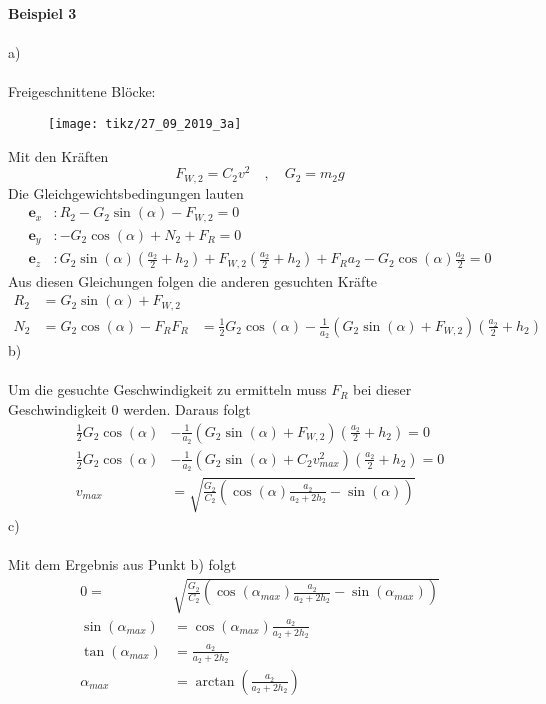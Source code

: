 \textbf{Beispiel 3}\\ \\
a)\\ \\
Freigeschnittene Blöcke:
\begin{figure}[h]
	\centering
	\texttt{[image: tikz/27\_09\_2019\_3a]}
\end{figure}
\newline
Mit den Kräften
\[
	F_{W,2} = C_2v^2 \quad,\quad G_2 = m_2g
\]
Die Gleichgewichtsbedingungen lauten
\begin{align*}
	\textbf{e}_x &: R_2 - G_2\sin(\alpha) - F_{W,2} = 0\\
	\textbf{e}_y &: -G_2\cos(\alpha) + N_2  + F_R= 0 \\
	\textbf{e}_z &: G_2\sin(\alpha)\left(\frac{a_2}{2} + h_2\right) + F_{W,2}\left(\frac{a_2}{2} + h_2\right) + F_Ra_2 - G_2\cos(\alpha)\frac{a_2}{2} = 0
\end{align*}
Aus diesen Gleichungen folgen die anderen gesuchten Kräfte
\begin{align*}
	R_2 &= G_2\sin(\alpha) + F_{W,2} \\
	N_2 &= G_2\cos(\alpha) - F_R
	F_R &= \frac{1}{2}G_2\cos(\alpha) - \frac{1}{a_2}\left(G_2\sin(\alpha) + F_{W,2}\right)\left(\frac{a_2}{2} + h_2\right)
\end{align*}
b)\\ \\
Um die gesuchte Geschwindigkeit zu ermitteln muss $F_R$ bei dieser Geschwindigkeit 0 werden. Daraus folgt
\begin{align*}
	\frac{1}{2}G_2\cos(\alpha) &- \frac{1}{a_2}\left(G_2\sin(\alpha) + F_{W,2}\right)\left(\frac{a_2}{2} + h_2\right) = 0 \\
	\frac{1}{2}G_2\cos(\alpha) &- \frac{1}{a_2}\left(G_2\sin(\alpha) + C_2v^2_{max}\right)\left(\frac{a_2}{2} + h_2\right) = 0 \\
	v_{max} &= \sqrt{\frac{G_2}{C_2}\left(\cos(\alpha)\frac{a_2}{a_2 + 2h_2} - \sin(\alpha)\right)}
\end{align*}
c)\\ \\
Mit dem Ergebnis aus Punkt b) folgt
\begin{align*}
	0 = &\sqrt{\frac{G_2}{C_2}\left(\cos(\alpha_{max})\frac{a_2}{a_2 + 2h_2} - \sin(\alpha_{max})\right)}\\
	\sin(\alpha_{max}) &= \cos(\alpha_{max})\frac{a_2}{a_2 + 2h_2}\\
		\tan(\alpha_{max}) &= \frac{a_2}{a_2 + 2h_2} \\
		\alpha_{max} &= \arctan\left(\frac{a_2}{a_2 + 2h_2}\right)
\end{align*}
